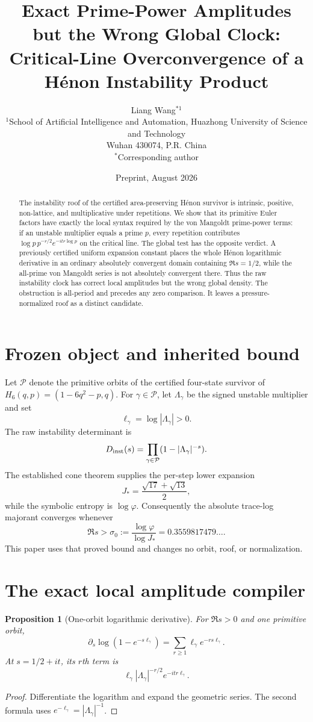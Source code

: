 \documentclass[11pt]{article}
\title{Exact Prime-Power Amplitudes but the Wrong Global Clock:\\
Critical-Line Overconvergence of a H\'enon Instability Product}
\author{Liang Wang$^{*1}$\\
\small $^{1}$School of Artificial Intelligence and Automation, Huazhong University of Science and Technology\\
\small Wuhan 430074, P.R. China\\
\small $^*$Corresponding author}
\date{Preprint, August 2026}
\newtheorem{proposition}[theorem]{Proposition}
\theoremstyle{remark}\newtheorem{remark}[theorem]{Remark}
\begin{document}
\maketitle
\begin{abstract}
The instability roof of the certified area-preserving H\'enon survivor is
intrinsic, positive, non-lattice, and multiplicative under repetitions.  We
show that its primitive Euler factors have exactly the local syntax required
by the von Mangoldt prime-power terms: if an unstable multiplier equals a
prime $p$, every repetition contributes
$\log p\,p^{-r/2}e^{-itr\log p}$ on the critical line.  The global test has
the opposite verdict.  A previously certified uniform expansion constant
places the whole H\'enon logarithmic derivative in an ordinary absolutely
convergent domain containing $\Re s=1/2$, while the all-prime von Mangoldt
series is not absolutely convergent there.  Thus the raw instability clock
has correct local amplitudes but the wrong global density.  The obstruction
is all-period and precedes any zero comparison.  It leaves a pressure-
normalized roof as a distinct candidate.
\end{abstract}

\section{Frozen object and inherited bound}
Let $\mathcal P$ denote the primitive orbits of the certified four-state
survivor of $H_6(q,p)=(1-6q^2-p,q)$.  For $\gamma\in\mathcal P$, let
$\Lambda_\gamma$ be the signed unstable multiplier and set
\[
\ell_\gamma=\log|\Lambda_\gamma|>0.
\]
The raw instability determinant is
\begin{equation}\label{eq:D}
D_{\rm inst}(s)=\prod_{\gamma\in\mathcal P}
(1-|\Lambda_\gamma|^{-s}).
\end{equation}
The established cone theorem supplies the per-step lower expansion
\[
J_*=\frac{\sqrt{17}+\sqrt{13}}2,
\]
while the symbolic entropy is $\log\varphi$.  Consequently the absolute
trace-log majorant converges whenever
\begin{equation}\label{eq:sigma0}
\Re s>\sigma_0:=\frac{\log\varphi}{\log J_*}
=0.3559817479\ldots.
\end{equation}
This paper uses that proved bound and changes no orbit, roof, or
normalization.

\section{The exact local amplitude compiler}
\begin{proposition}[One-orbit logarithmic derivative]\label{prop:local}
For $\Re s>0$ and one primitive orbit,
\[
\partial_s\log(1-e^{-s\ell_\gamma})
=\sum_{r\ge1}\ell_\gamma e^{-rs\ell_\gamma}.
\]
At $s=1/2+it$, its $r$th term is
\[
\ell_\gamma|\Lambda_\gamma|^{-r/2}
e^{-itr\ell_\gamma}.
\]
\end{proposition}
\begin{proof}
Differentiate the logarithm and expand the geometric series.  The second
formula uses $e^{-\ell_\gamma}=|\Lambda_\gamma|^{-1}$.
\end{proof}
\end{document}
